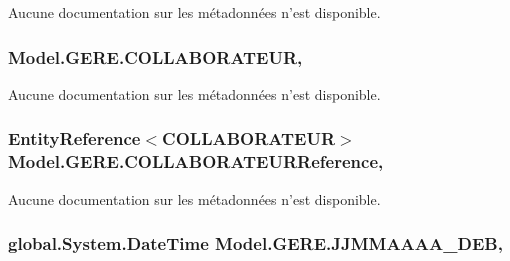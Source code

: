 Aucune documentation sur les métadonnées n'est disponible. 

\hypertarget{class_model_1_1_g_e_r_e_a8a670e1a6e5780b22b61677e850fa913}{
\subsubsection[{C\-O\-L\-L\-A\-B\-O\-R\-A\-T\-E\-U\-R}]{ Model.\-G\-E\-R\-E.\-C\-O\-L\-L\-A\-B\-O\-R\-A\-T\-E\-U\-R\hspace{0.3cm}{\ttfamily [get]}, {\ttfamily [set]}}}\label{class_model_1_1_g_e_r_e_a8a670e1a6e5780b22b61677e850fa913}


Aucune documentation sur les métadonnées n'est disponible. 

\hypertarget{class_model_1_1_g_e_r_e_a295a48fabbabb795d933558e7918a334}{
\subsubsection[{C\-O\-L\-L\-A\-B\-O\-R\-A\-T\-E\-U\-R\-Reference}]{\setlength{\rightskip}{0pt plus 5cm}Entity\-Reference$<${\bf C\-O\-L\-L\-A\-B\-O\-R\-A\-T\-E\-U\-R}$>$ Model.\-G\-E\-R\-E.\-C\-O\-L\-L\-A\-B\-O\-R\-A\-T\-E\-U\-R\-Reference\hspace{0.3cm}{\ttfamily [get]}, {\ttfamily [set]}}}\label{class_model_1_1_g_e_r_e_a295a48fabbabb795d933558e7918a334}


Aucune documentation sur les métadonnées n'est disponible. 

\hypertarget{class_model_1_1_g_e_r_e_a958847177a345b8807e3f3a5a0e7723e}{
\subsubsection[{J\-J\-M\-M\-A\-A\-A\-A\-\_\-\-D\-E\-B}]{\setlength{\rightskip}{0pt plus 5cm}global.\-System.\-Date\-Time Model.\-G\-E\-R\-E.\-J\-J\-M\-M\-A\-A\-A\-A\-\_\-\-D\-E\-B\hspace{0.3cm}{\ttfamily [get]}, {\ttfamily [set]}}}\label{class_model_1_1_g_e_r_e_a958847177a345b8807e3f3a5a0e7723e}


